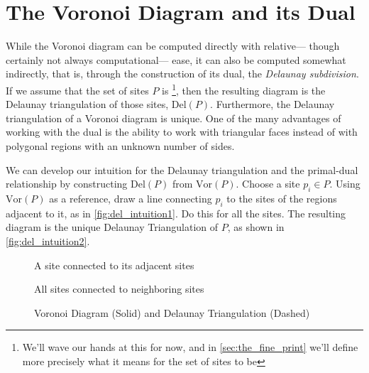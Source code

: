 \documentclass[12pt,twoside]{reedthesis}
\begin{document}
  
  \section{The Voronoi Diagram and its Dual} %
  \label{sec:the_voronoi_diagram_and_its_dual}
    While the Voronoi diagram can be computed directly with relative--- though certainly not always computational--- ease, it can also be computed somewhat indirectly, that is, through the construction of its dual, the \emph{Delaunay subdivision}. If we assume that the set of sites $P$ is \footnote{We'll wave our hands at this for now, and in \cref{sec:the_fine_print} we'll define more precisely what it means for the set of sites to be }, then the resulting diagram is the Delaunay triangulation of those sites, $\mbox{Del}(P)$. Furthermore, the Delaunay triangulation of a Voronoi diagram is unique. One of the many advantages of working with the dual is the ability to work with triangular faces instead of with polygonal regions with an unknown number of sides. \par

    We can develop our intuition for the Delaunay triangulation and the primal-dual relationship by constructing $\mbox{Del}(P)$ from $\mbox{Vor}(P)$. Choose a site $p_{i} \in P$. Using $\mbox{Vor}(P)$ as a reference, draw a line connecting $p_{i}$ to the sites of the regions adjacent to it, as in \cref{fig:del_intuition1}. Do this for all the sites. The resulting diagram is the unique Delaunay Triangulation of $P$, as shown in \cref{fig:del_intuition2}.

    \begin{figure}[!htb]
      \centering
      \begin{subtable}{.475\textwidth}
        
        \caption{A site connected to its adjacent sites}
        \label{fig:del_intuition1}
      \end{subtable}%
      \begin{subtable}{.475\textwidth}
        
        \caption{All sites connected to neighboring sites}
        \label{fig:del_intuition2}
      \end{subtable}
      \caption{Voronoi Diagram (Solid) and Delaunay Triangulation (Dashed)}
      \label{fig:del_intuition}
    \end{figure}
\end{document}
